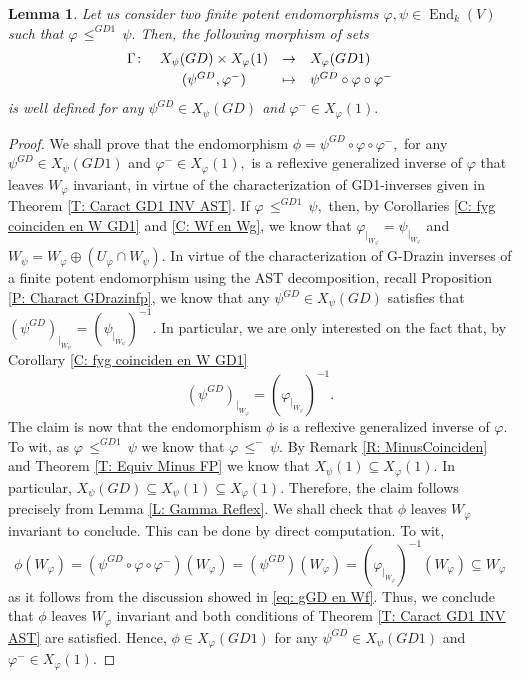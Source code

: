 \documentclass[10pt,a4paper]{amsart}
\newtheorem{lem}[defn]{Lemma}
\theoremstyle{plain}
\theoremstyle{remark}
\numberwithin{equation}{section} \numberwithin{defn}{section}
\newcommand\ed{\operatorname{End}}
\newcommand{\f}{\varphi}
\newcommand{\g}{\psi}
\begin{document}
\begin{lem}\label{L: gGDffMenos}
Let us consider two finite potent endomorphisms $\f , \g \in \ed_k(V)$ such that $\f \, \leq^{GD1}\, \g .$ Then, the following morphism of sets $$\begin{array}{rccl}
\Gamma \colon & X_{\g}(GD)\times X_{\f}(1)  & \rightarrow & X_{\f}(GD1)\smallskip\\
& (\g^{GD},\f^{-}) & \mapsto & \g^{GD}\circ \f \circ \f^{-}
\end{array} $$ is well defined for any $\g^{GD}\in X_{\g}(GD)$ and $\f^-\in X_{\f}(1).$
\end{lem}
\begin{proof}
We shall prove that the endomorphism $\phi = \g^{GD}\circ \f \circ \f^{-},$ for any $\g^{GD}\in X_{\g}(GD1)$ and $\f^-\in X_{\f}(1),$ is a reflexive generalized inverse of $\f$ that leaves $W_{\f}$ invariant, in virtue of the characterization of GD1-inverses given in Theorem \ref{T: Caract GD1 INV AST}. If $\f \, \leq^{GD1} \, \g ,$ then, by Corollaries \ref{C: fyg coinciden en W GD1} and \ref{C: Wf en Wg}, we know that $\f_{\vert_{W_{\f}}}=\g_{\vert_{W_{\f}}}$ and $W_{\g}=W_{\f}\oplus (U_{\f}\cap W_{\g}).$ In virtue of the characterization of G-Drazin inverses of a finite potent endomorphism using the AST decomposition, recall Proposition \ref{P: Charact GDrazinfp}, we know that any $\g^{GD}\in X_{\g}(GD)$ satisfies that $(\g^{GD})_{\vert_{W_{\g}}}=(\g_{\vert_{W_{\g}}})^{-1}.$ In particular, we are only interested on the fact that, by Corollary \ref{C: fyg coinciden en W GD1}  \begin{equation}\label{eq: gGD en Wf}
(\g^{GD})_{\vert_{W_{\f}}}=(\f_{\vert_{W_{\f}}})^{-1}.
\end{equation}
The claim is now that the endomorphism $\phi$ is a reflexive generalized inverse of $\f .$ To wit, as $\f \, \leq^{GD1} \, \g$ we know that $\f \, \leq^{-} \, \g .$ By Remark \ref{R: MinusCoinciden} and Theorem \ref{T: Equiv Minus FP} we know that $X_{\g}(1)\subseteq X_{\f}(1).$ In particular, $X_{\g}(GD)\subseteq X_{\g}(1)\subseteq X_{\f}(1).$ Therefore, the claim follows precisely from Lemma \ref{L: Gamma Reflex}. We shall check that $\phi$ leaves $W_{\f}$ invariant to conclude. This can be done by direct computation. To wit, $$\phi (W_{\f})=(\g^{GD}\circ \f \circ \f^{-})(W_{\f})=(\g^{GD})(W_{\f})=(\f_{\vert_{W_{\f}}})^{-1}(W_{\f})\subseteq W_{\f} $$ as it follows from the discussion showed in \eqref{eq: gGD en Wf}. Thus, we conclude that $\phi$ leaves $W_{\f}$ invariant and both conditions of Theorem \ref{T: Caract GD1 INV AST} are satisfied. Hence, $\phi \in X_{\f}(GD1)$ for any $\g^{GD}\in X_{\g}(GD1)$ and $\f^-\in X_{\f}(1).$
\end{proof}
\end{document}
